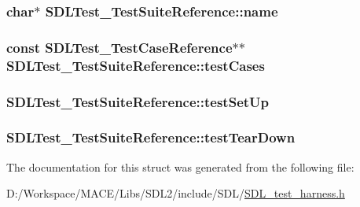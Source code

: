 \subsubsection[{\texorpdfstring{name}{name}}]{\setlength{\rightskip}{0pt plus 5cm}char$\ast$ S\+D\+L\+Test\+\_\+\+Test\+Suite\+Reference\+::name}\hypertarget{struct_s_d_l_test___test_suite_reference_a8b002d932f91b321b384e59ae17f8f39}{}\label{struct_s_d_l_test___test_suite_reference_a8b002d932f91b321b384e59ae17f8f39}
\subsubsection[{\texorpdfstring{test\+Cases}{testCases}}]{\setlength{\rightskip}{0pt plus 5cm}const {\bf S\+D\+L\+Test\+\_\+\+Test\+Case\+Reference}$\ast$$\ast$ S\+D\+L\+Test\+\_\+\+Test\+Suite\+Reference\+::test\+Cases}\hypertarget{struct_s_d_l_test___test_suite_reference_a06d97ce5bcf9ceb1300cc4aa39c028d3}{}\label{struct_s_d_l_test___test_suite_reference_a06d97ce5bcf9ceb1300cc4aa39c028d3}
\subsubsection[{\texorpdfstring{test\+Set\+Up}{testSetUp}}]{ S\+D\+L\+Test\+\_\+\+Test\+Suite\+Reference\+::test\+Set\+Up}\hypertarget{struct_s_d_l_test___test_suite_reference_a8aa788b982efb93c93c2ab01202e0007}{}\label{struct_s_d_l_test___test_suite_reference_a8aa788b982efb93c93c2ab01202e0007}
\subsubsection[{\texorpdfstring{test\+Tear\+Down}{testTearDown}}]{ S\+D\+L\+Test\+\_\+\+Test\+Suite\+Reference\+::test\+Tear\+Down}\hypertarget{struct_s_d_l_test___test_suite_reference_ad66abaf20653fd7361d28c69f88ac702}{}\label{struct_s_d_l_test___test_suite_reference_ad66abaf20653fd7361d28c69f88ac702}


The documentation for this struct was generated from the following file\+:\begin{DoxyCompactItemize}
\item 
D\+:/\+Workspace/\+M\+A\+C\+E/\+Libs/\+S\+D\+L2/include/\+S\+D\+L/\hyperlink{_s_d_l__test__harness_8h}{S\+D\+L\+\_\+test\+\_\+harness.\+h}\end{DoxyCompactItemize}

